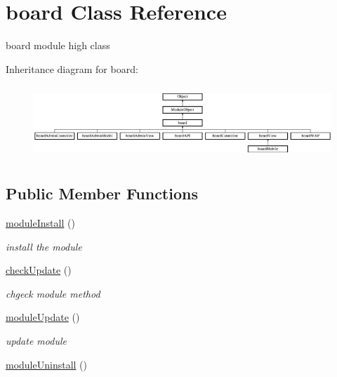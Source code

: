\hypertarget{classboard}{}\section{board Class Reference}
\label{classboard}


board module high class  


Inheritance diagram for board\+:\begin{figure}[H]
\begin{center}
\leavevmode
\includegraphics[height=2.777778cm]{classboard}
\end{center}
\end{figure}
\subsection*{Public Member Functions}
\begin{DoxyCompactItemize}
\item 
\hyperlink{classboard_abcf015f709c0c2809dba55f74f059ebc}{module\+Install} ()
\begin{DoxyCompactList}\small\item\em install the module \end{DoxyCompactList}\item 
\hyperlink{classboard_a64506bb5293024e146d0ff7deeb27684}{check\+Update} ()
\begin{DoxyCompactList}\small\item\em chgeck module method \end{DoxyCompactList}\item 
\hyperlink{classboard_ab6b25ead0f4ec6d25f60338c7cdd33b5}{module\+Update} ()
\begin{DoxyCompactList}\small\item\em update module \end{DoxyCompactList}\item 
\hyperlink{classboard_a1e6008fcf4e2a540370e242246b8e721}{module\+Uninstall} ()
\end{DoxyCompactItemize}
